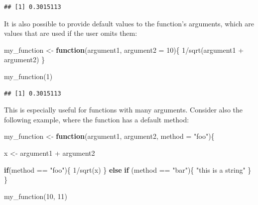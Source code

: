\documentclass[
]{article}
\newenvironment{Shaded}{\begin{snugshade}}{\end{snugshade}}
\newcommand{\AttributeTok}[1]{\textcolor[rgb]{0.77,0.63,0.00}{#1}}
\newcommand{\ControlFlowTok}[1]{\textcolor[rgb]{0.13,0.29,0.53}{\textbf{#1}}}
\newcommand{\DecValTok}[1]{\textcolor[rgb]{0.00,0.00,0.81}{#1}}
\newcommand{\FunctionTok}[1]{\textcolor[rgb]{0.00,0.00,0.00}{#1}}
\newcommand{\NormalTok}[1]{#1}
\newcommand{\OtherTok}[1]{\textcolor[rgb]{0.56,0.35,0.01}{#1}}
\newcommand{\SpecialCharTok}[1]{\textcolor[rgb]{0.00,0.00,0.00}{#1}}
\newcommand{\StringTok}[1]{\textcolor[rgb]{0.31,0.60,0.02}{#1}}
\begin{document}
\begin{verbatim}
## [1] 0.3015113
\end{verbatim}

It is also possible to provide default values to the function's arguments, which are values that are used
if the user omits them:

\begin{Shaded}
\begin{Highlighting}[]
\NormalTok{my\_function }\OtherTok{\textless{}{-}} \ControlFlowTok{function}\NormalTok{(argument1, }\AttributeTok{argument2 =} \DecValTok{10}\NormalTok{)\{}
\DecValTok{1}\SpecialCharTok{/}\FunctionTok{sqrt}\NormalTok{(argument1 }\SpecialCharTok{+}\NormalTok{ argument2)}
\NormalTok{\}}
\end{Highlighting}
\end{Shaded}

\begin{Shaded}
\begin{Highlighting}[]
\FunctionTok{my\_function}\NormalTok{(}\DecValTok{1}\NormalTok{)}
\end{Highlighting}
\end{Shaded}

\begin{verbatim}
## [1] 0.3015113
\end{verbatim}

This is especially useful for functions with many arguments. Consider also the following example,
where the function has a default method:

\begin{Shaded}
\begin{Highlighting}[]
\NormalTok{my\_function }\OtherTok{\textless{}{-}} \ControlFlowTok{function}\NormalTok{(argument1, argument2, }\AttributeTok{method =} \StringTok{"foo"}\NormalTok{)\{}
  
\NormalTok{  x }\OtherTok{\textless{}{-}}\NormalTok{ argument1 }\SpecialCharTok{+}\NormalTok{ argument2}
  
  \ControlFlowTok{if}\NormalTok{(method }\SpecialCharTok{==} \StringTok{"foo"}\NormalTok{)\{}
    \DecValTok{1}\SpecialCharTok{/}\FunctionTok{sqrt}\NormalTok{(x)}
\NormalTok{  \} }\ControlFlowTok{else} \ControlFlowTok{if}\NormalTok{ (method }\SpecialCharTok{==} \StringTok{"bar"}\NormalTok{)\{}
    \StringTok{"this is a string"}
\NormalTok{    \}}
\NormalTok{\}}

\FunctionTok{my\_function}\NormalTok{(}\DecValTok{10}\NormalTok{, }\DecValTok{11}\NormalTok{)}
\end{Highlighting}
\end{Shaded}
\end{document}
